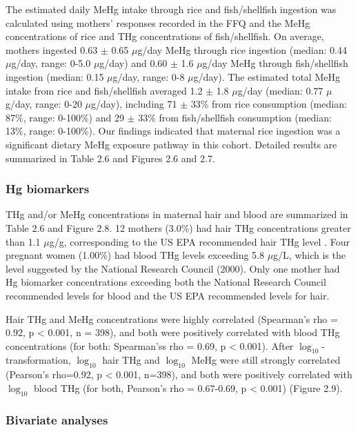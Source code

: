 The estimated daily MeHg intake through rice and fish/shellfish ingestion was calculated using mothers' responses recorded in the FFQ and the MeHg concentrations of rice and THg concentrations of fish/shellfish. On average, mothers ingested 0.63 \({\pm}\) 0.65 \({\mu}\)g/day MeHg through rice ingestion (median: 0.44 \({\mu}\)g/day, range: 0-5.0 \({\mu}\)g/day) and 0.60 \({\pm}\) 1.6 \({\mu}\)g/day MeHg through fish/shellfish ingestion (median: 0.15 \({\mu}\)g/day, range: 0-8 \({\mu}\)g/day). The estimated total MeHg intake from rice and fish/shellfish averaged 1.2 \({\pm}\) 1.8 \({\mu}\)g/day (median: 0.77 \({\mu}\)g/day, range: 0-20 \({\mu}\)g/day), including 71 \({\pm}\) 33\% from rice consumption (median: 87\%, range: 0-100\%) and 29 \({\pm}\) 33\% from fish/shellfish consumption (median: 13\%, range: 0-100\%). Our findings indicated that maternal rice ingestion was a significant dietary MeHg exposure pathway in this cohort.  Detailed results are summarized in Table 2.6 and Figures 2.6 and 2.7.

\subsubsection{Hg biomarkers}

THg and/or MeHg concentrations in maternal hair and blood are summarized in Table 2.6 and Figure 2.8. 12 mothers (3.0\%) had hair THg concentrations greater than 1.1 \({\mu}\)g/g, corresponding to the US EPA recommended hair THg level \citep{usepa1997hgcongress}. Four pregnant women (1.00\%) had blood THg levels exceeding 5.8 \({\mu}\)g/L, which is the level suggested by the National Research Council (2000). Only one mother had Hg biomarker concentrations exceeding both the National Research Council recommended levels for blood and the US EPA recommended levels for hair.

Hair THg and MeHg concentrations were highly correlated (Spearman's rho = 0.92, p < 0.001, n = 398), and both were positively correlated with blood THg concentrations (for both: Spearman'ss rho = 0.69, p < 0.001). After $\log_{10}$-transformation, $\log_{10}$ hair THg and $\log_{10}$ MeHg were still strongly correlated (Pearson's rho=0.92, p < 0.001, n=398), and both were positively correlated with $\log_{10}$ blood THg (for both, Pearson's rho = 0.67-0.69, p < 0.001) (Figure 2.9). 

\subsubsection{Bivariate analyses}

